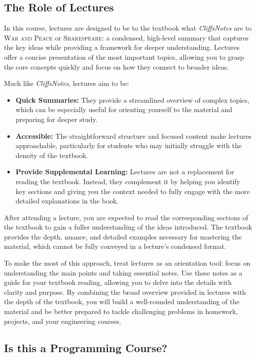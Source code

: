 \subsection{The Role of Lectures}

In this course, lectures are designed to be to the textbook what \textit{CliffsNotes} are to \textsc{War and Peace} or \textsc{Shakespeare}: a condensed, high-level summary that captures the key ideas while providing a framework for deeper understanding. Lectures offer a concise presentation of the most important topics, allowing you to grasp the core concepts quickly and focus on how they connect to broader ideas. 

Much like \textit{CliffsNotes}, lectures aim to be:
\begin{itemize}
    \item \textbf{Quick Summaries:} They provide a streamlined overview of complex topics, which can be especially useful for orienting yourself to the material and preparing for deeper study.
    \item \textbf{Accessible:} The straightforward structure and focused content make lectures approachable, particularly for students who may initially struggle with the density of the textbook.
    \item \textbf{Provide Supplemental Learning:} Lectures are not a replacement for reading the textbook. Instead, they complement it by helping you identify key sections and giving you the context needed to fully engage with the more detailed explanations in the book.
\end{itemize}

After attending a lecture, you are expected to read the corresponding sections of the textbook to gain a fuller understanding of the ideas introduced. The textbook provides the depth, nuance, and detailed examples necessary for mastering the material, which cannot be fully conveyed in a lecture's condensed format. 

To make the most of this approach, treat lectures as an orientation tool: focus on understanding the main points and taking essential notes. Use these notes as a guide for your textbook reading, allowing you to delve into the details with clarity and purpose. By combining the broad overview provided in lectures with the depth of the textbook, you will build a well-rounded understanding of the material and be better prepared to tackle challenging problems in homework, projects, and your engineering courses.
 

\subsection{Is this a Programming Course?}

